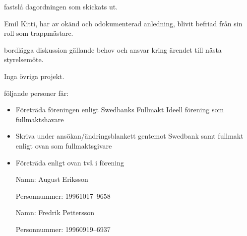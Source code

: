 \documentclass{protokoll}
\begin{document}
\newpage  


\begin{beslut}
     \att fastslå dagordningen som skickats ut.
\end{beslut}

Emil Kitti, har av okänd och odokumenterad anledning, blivit befriad från sin roll som trappmästare. 
\begin{beslut}
    \att bordlägga diskussion gällande behov och ansvar kring ärendet till nästa styrelsemöte.
\end{beslut}
Inga övriga projekt.

\begin{beslut}
    \att följande personer får:
    \begin{itemize}
        \item Företräda föreningen enligt Swedbanks Fullmakt Ideell förening som fullmaktshavare
        \item Skriva under ansökan/ändringsblankett gentemot Swedbank samt fullmakt enligt ovan som fullmaktsgivare
        \item Företräda enligt ovan två i förening
    \end{itemize}
    \begin{itemize}
        \item[Namn: ] August Eriksson
        \item[Personnummer: ] 19961017--9658

        \item[Namn: ] Fredrik Pettersson
        \item[Personnummer: ] 19960919--6937
    \end{itemize}
\end{beslut}
\end{document}
